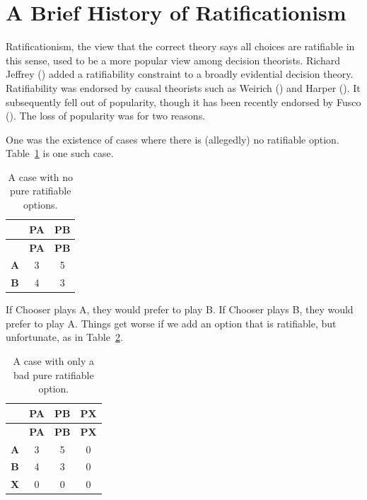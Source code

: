 \documentclass[
  12pt,
  letterpaper,
  DIV=11,
  numbers=noendperiod]{scrreprt}
\begin{document}
\section{A Brief History of
Ratificationism}\label{a-brief-history-of-ratificationism}

Ratificationism, the view that the correct theory says all choices are
ratifiable in this sense, used to be a more popular view among decision
theorists. Richard Jeffrey () added a
ratifiability constraint to a broadly evidential decision theory.
Ratifiability was endorsed by causal theorists such as Weirich
() and Harper
(). It subsequently fell out of
popularity, though it has been recently endorsed by Fusco
(). The loss of popularity was for two
reasons.

One was the existence of cases where there is (allegedly) no ratifiable
option. Table~\ref{tbl-no-pure} is one such case.

\begin{longtable}[]{@{}ccc@{}}
\caption{A case with no pure ratifiable
options.}\label{tbl-no-pure}\tabularnewline
\toprule\noalign{}
& \textbf{PA} & \textbf{PB} \\
\midrule\noalign{}
\endfirsthead
\toprule\noalign{}
& \textbf{PA} & \textbf{PB} \\
\midrule\noalign{}
\endhead
\bottomrule\noalign{}
\endlastfoot
\textbf{A} & 3 & 5 \\
\textbf{B} & 4 & 3 \\
\end{longtable}

If Chooser plays A, they would prefer to play B. If Chooser plays B,
they would prefer to play A. Things get worse if we add an option that
is ratifiable, but unfortunate, as in Table~\ref{tbl-bad-third}.

\begin{longtable}[]{@{}cccc@{}}
\caption{A case with only a bad pure ratifiable
option.}\label{tbl-bad-third}\tabularnewline
\toprule\noalign{}
& \textbf{PA} & \textbf{PB} & \textbf{PX} \\
\midrule\noalign{}
\endfirsthead
\toprule\noalign{}
& \textbf{PA} & \textbf{PB} & \textbf{PX} \\
\midrule\noalign{}
\endhead
\bottomrule\noalign{}
\endlastfoot
\textbf{A} & 3 & 5 & 0 \\
\textbf{B} & 4 & 3 & 0 \\
\textbf{X} & 0 & 0 & 0 \\
\end{longtable}
\end{document}
